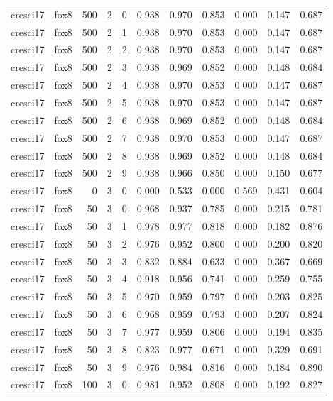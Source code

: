 \begin{tabular}{llrrrrrrrrr}
cresci17 & fox8 & 500 & 2 & 0 & 0.938 & 0.970 & 0.853 & 0.000 & 0.147 & 0.687 \\
cresci17 & fox8 & 500 & 2 & 1 & 0.938 & 0.970 & 0.853 & 0.000 & 0.147 & 0.687 \\
cresci17 & fox8 & 500 & 2 & 2 & 0.938 & 0.970 & 0.853 & 0.000 & 0.147 & 0.687 \\
cresci17 & fox8 & 500 & 2 & 3 & 0.938 & 0.969 & 0.852 & 0.000 & 0.148 & 0.684 \\
cresci17 & fox8 & 500 & 2 & 4 & 0.938 & 0.970 & 0.853 & 0.000 & 0.147 & 0.687 \\
cresci17 & fox8 & 500 & 2 & 5 & 0.938 & 0.970 & 0.853 & 0.000 & 0.147 & 0.687 \\
cresci17 & fox8 & 500 & 2 & 6 & 0.938 & 0.969 & 0.852 & 0.000 & 0.148 & 0.684 \\
cresci17 & fox8 & 500 & 2 & 7 & 0.938 & 0.970 & 0.853 & 0.000 & 0.147 & 0.687 \\
cresci17 & fox8 & 500 & 2 & 8 & 0.938 & 0.969 & 0.852 & 0.000 & 0.148 & 0.684 \\
cresci17 & fox8 & 500 & 2 & 9 & 0.938 & 0.966 & 0.850 & 0.000 & 0.150 & 0.677 \\
cresci17 & fox8 & 0 & 3 & 0 & 0.000 & 0.533 & 0.000 & 0.569 & 0.431 & 0.604 \\
cresci17 & fox8 & 50 & 3 & 0 & 0.968 & 0.937 & 0.785 & 0.000 & 0.215 & 0.781 \\
cresci17 & fox8 & 50 & 3 & 1 & 0.978 & 0.977 & 0.818 & 0.000 & 0.182 & 0.876 \\
cresci17 & fox8 & 50 & 3 & 2 & 0.976 & 0.952 & 0.800 & 0.000 & 0.200 & 0.820 \\
cresci17 & fox8 & 50 & 3 & 3 & 0.832 & 0.884 & 0.633 & 0.000 & 0.367 & 0.669 \\
cresci17 & fox8 & 50 & 3 & 4 & 0.918 & 0.956 & 0.741 & 0.000 & 0.259 & 0.755 \\
cresci17 & fox8 & 50 & 3 & 5 & 0.970 & 0.959 & 0.797 & 0.000 & 0.203 & 0.825 \\
cresci17 & fox8 & 50 & 3 & 6 & 0.968 & 0.959 & 0.793 & 0.000 & 0.207 & 0.824 \\
cresci17 & fox8 & 50 & 3 & 7 & 0.977 & 0.959 & 0.806 & 0.000 & 0.194 & 0.835 \\
cresci17 & fox8 & 50 & 3 & 8 & 0.823 & 0.977 & 0.671 & 0.000 & 0.329 & 0.691 \\
cresci17 & fox8 & 50 & 3 & 9 & 0.976 & 0.984 & 0.816 & 0.000 & 0.184 & 0.890 \\
cresci17 & fox8 & 100 & 3 & 0 & 0.981 & 0.952 & 0.808 & 0.000 & 0.192 & 0.827 \\

\end{tabular}

